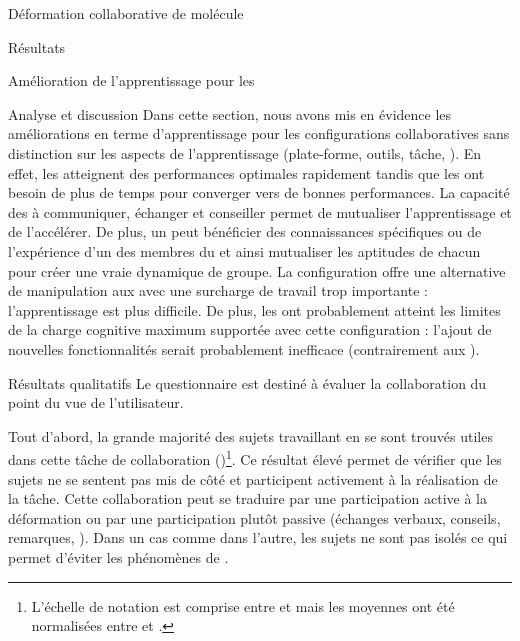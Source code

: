 \documentclass[myfrancais,ngerman,english,frenchb]{mythesis}
\begin{document}
\begin{mychapter}{Déformation collaborative de molécule}
\begin{mysection}{Résultats}
\begin{mysubsection}{Amélioration de l'apprentissage pour les }
\begin{mysubsubsection}{Analyse et discussion}
					Dans cette section, nous avons mis en évidence les améliorations en terme d'apprentissage pour les configurations collaboratives sans distinction sur les aspects de l'apprentissage (plate-forme, outils, tâche, \myetc).
					En effet, les  atteignent des performances optimales rapidement tandis que les  ont besoin de plus de temps pour converger vers de bonnes performances.
					La capacité des  à communiquer, échanger et conseiller permet de mutualiser l'apprentissage et de l'accélérer.
					De plus, un  peut bénéficier des connaissances spécifiques ou de l'expérience d'un des membres du  et ainsi mutualiser les aptitudes de chacun pour créer une vraie dynamique de groupe.
					La configuration  offre une alternative de manipulation aux  avec une surcharge de travail trop importante : l'apprentissage est plus difficile.
					De plus, les  ont probablement atteint les limites de la charge cognitive maximum supportée avec cette configuration : l'ajout de nouvelles fonctionnalités serait probablement inefficace (contrairement aux ).
				\end{mysubsubsection}
			\end{mysubsection}
			\begin{mysubsection}{Résultats qualitatifs}
				Le questionnaire est destiné à évaluer la collaboration du point du vue de l'utilisateur.

				Tout d'abord, la grande majorité des sujets travaillant en  se sont trouvés utiles dans cette tâche de collaboration ()\footnote{L'échelle de notation est comprise entre  et  mais les moyennes ont été normalisées entre  et .}.
				Ce résultat élevé permet de vérifier que les sujets ne se sentent pas mis de côté et participent activement à la réalisation de la tâche.
				Cette collaboration peut se traduire par une participation active à la déformation ou par une participation plutôt passive (échanges verbaux, conseils, remarques, \myetc).
				Dans un cas comme dans l'autre, les sujets ne sont pas isolés ce qui permet d'éviter les phénomènes de .


\end{mysubsection}
\end{mysection}
\end{mychapter}
\end{document}
